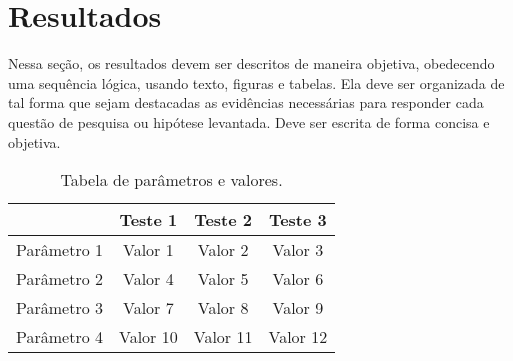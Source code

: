\chapter{Resultados}
\label{ch:resultados}
Nessa seção, os resultados devem ser descritos de maneira objetiva, obedecendo uma sequência lógica, usando texto, figuras e tabelas. Ela deve ser organizada de tal forma que sejam destacadas as evidências necessárias para responder cada questão de pesquisa ou hipótese levantada. Deve ser escrita de forma concisa e objetiva.

\begin{table}[h]
    \vspace{0.2cm}
    \centering
    \caption{Tabela de parâmetros e valores.}
    \begin{tabular}{c|c|c|c} 
                    & Teste 1 & Teste 2 & Teste 3 \\ \hline
        Parâmetro 1 & Valor 1 & Valor 2 & Valor 3 \\
        Parâmetro 2 & Valor 4 & Valor 5 & Valor 6 \\
        Parâmetro 3 & Valor 7 & Valor 8 & Valor 9 \\
        Parâmetro 4 & Valor 10 & Valor 11 & Valor 12
    \end{tabular}
    \label{tabelaResultados}
    \vspace{0.2cm}
\end{table}

